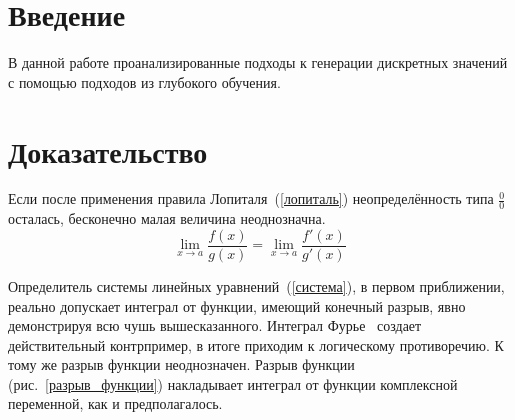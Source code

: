 \documentclass{spbau-diploma}
\begin{document}


\maketitle
\tableofcontents

\section*{Введение}
В данной работе проанализированные подходы к генерации дискретных значений с
помощью подходов из глубокого обучения.

\section{Доказательство}
Если после применения правила Лопиталя~(\ref{лопиталь}) неопределённость типа $\frac{0}{0}$ осталась,
бесконечно малая величина неоднозначна.
\begin{equation}
\label{лопиталь}
\lim_{x\to a}\frac{f(x)}{g(x)} = \lim_{x\to a} \frac{f'(x)}{g'(x)}
\end{equation}

Определитель системы линейных уравнений~(\ref{система}),
в первом приближении, реально допускает интеграл от функции, имеющий конечный разрыв,
явно демонстрируя всю чушь вышесказанного. Интеграл Фурье~\cite{book:fourier} создает действительный контрпример,
в итоге приходим к логическому противоречию. К тому же разрыв функции неоднозначен.
Разрыв функции (рис.~\ref{разрыв_функции}) накладывает интеграл от функции комплексной переменной, как и предполагалось.
\end{document}
